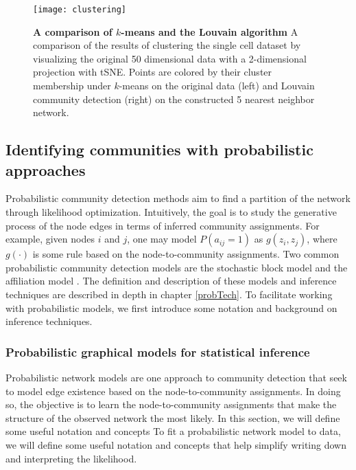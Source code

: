  \begin{figure}
\begin{center}
\texttt{[image: clustering]}
\caption{{\bf A comparison of $k$-means and the Louvain algorithm} A comparison of the results of clustering the single cell dataset by visualizing the original 50 dimensional data with a 2-dimensional projection with tSNE. Points are colored by their cluster membership under $k$-means on the original data (left) and Louvain community detection (right) on the constructed 5 nearest neighbor network.}
\label{fig:clustering}
\end{center}
\end{figure}

\subsection{Identifying communities with probabilistic approaches}

\indent Probabilistic community detection methods aim to find a partition of the network through likelihood optimization. Intuitively, the goal is to study the generative process of the node edges in terms of inferred community assignments. For example, given nodes $i$ and $j$, one may model $P(a_{ij}=1)$ as $g(z_{i},z_{j})$, where $g(\cdot)$ is some rule based on the node-to-community assignments. Two common probabilistic community detection models are the stochastic block model \cite{originalSBM} and the affiliation model \cite{affil}. The definition and description of these models and inference techniques are described in depth in chapter \ref{probTech}. To facilitate working with probabilistic models, we first introduce some notation and background on inference techniques. 

\subsubsection{Probabilistic graphical models for statistical inference}
\label{pgm}
Probabilistic network models are one approach to community detection that seek to model edge existence based on the node-to-community assignments. In doing so, the objective is to learn the node-to-community assignments that make the structure of the observed network the most likely. In this section, we will define some useful notation and concepts  To fit a probabilistic network model to data, we will define some useful notation and concepts that help simplify writing down and interpreting the likelihood. 

